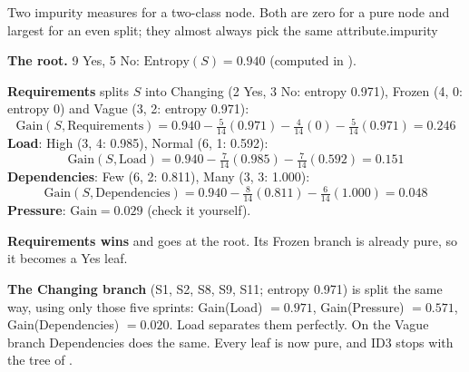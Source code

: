 %
{Two impurity measures for a two-class node. Both are zero for a pure node and largest
for an even split; they almost always pick the same attribute.}{impurity}

\begin{worked}
\textbf{The root.} 9 Yes, 5 No: $\text{Entropy}(S) = 0.940$ (computed in ).

\smallskip
\textbf{Requirements} splits $S$ into Changing (2 Yes, 3 No: entropy 0.971), Frozen
(4, 0: entropy 0) and Vague (3, 2: entropy 0.971):
\[
\text{Gain}(S, \text{Requirements}) = 0.940 - \tfrac{5}{14}(0.971) - \tfrac{4}{14}(0)
- \tfrac{5}{14}(0.971) = \mathbf{0.246}
\]
\textbf{Load}: High (3, 4: 0.985), Normal (6, 1: 0.592):
\[
\text{Gain}(S, \text{Load}) = 0.940 - \tfrac{7}{14}(0.985) - \tfrac{7}{14}(0.592) = \mathbf{0.151}
\]
\textbf{Dependencies}: Few (6, 2: 0.811), Many (3, 3: 1.000):
\[
\text{Gain}(S, \text{Dependencies}) = 0.940 - \tfrac{8}{14}(0.811) - \tfrac{6}{14}(1.000) = \mathbf{0.048}
\]
\textbf{Pressure}: $\text{Gain} = \mathbf{0.029}$ (check it yourself).

\smallskip
\textbf{Requirements wins} and goes at the root. Its Frozen branch is already pure,
so it becomes a Yes leaf.

\smallskip
\textbf{The Changing branch} (S1, S2, S8, S9, S11; entropy 0.971) is split the
same way, using only those five sprints: Gain(Load) $= 0.971$, Gain(Pressure)
$= 0.571$, Gain(Dependencies) $= 0.020$. Load separates them perfectly. On the
Vague branch Dependencies does the same. Every leaf is now pure, and ID3 stops
with the tree of .
\end{worked}

